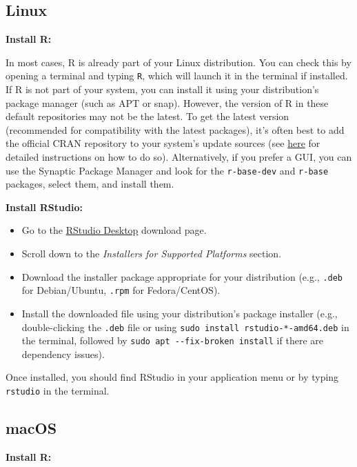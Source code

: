\documentclass[
]{book}
\providecommand{\tightlist}{%
  \setlength{\itemsep}{0pt}\setlength{\parskip}{0pt}}
\begin{document}
\subsection{Linux}\label{linux}

\textbf{Install R:}

In most cases, R is already part of your Linux distribution. You can check this by opening a terminal and typing \texttt{R}, which will launch it in the terminal if installed. If R is not part of your system, you can install it using your distribution's package manager (such as APT or snap). However, the version of R in these default repositories may not be the latest. To get the latest version (recommended for compatibility with the latest packages), it's often best to add the official CRAN repository to your system's update sources (see \href{https://cran.r-project.org/bin/linux/ubuntu/fullREADME.html}{here} for detailed instructions on how to do so). Alternatively, if you prefer a GUI, you can use the Synaptic Package Manager and look for the \texttt{r-base-dev} and \texttt{r-base} packages, select them, and install them.

\textbf{Install RStudio:}

\begin{itemize}
\tightlist
\item
  Go to the \href{https://posit.co/download/rstudio-desktop/}{RStudio Desktop} download page.
\item
  Scroll down to the \emph{Installers for Supported Platforms} section.
\item
  Download the installer package appropriate for your distribution (e.g., \texttt{.deb} for Debian/Ubuntu, \texttt{.rpm} for Fedora/CentOS).
\item
  Install the downloaded file using your distribution's package installer (e.g., double-clicking the \texttt{.deb} file or using \texttt{sudo\ install\ rstudio-*-amd64.deb} in the terminal, followed by \texttt{sudo\ apt\ -\/-fix-broken\ install} if there are dependency issues).
\end{itemize}

Once installed, you should find RStudio in your application menu or by typing \texttt{rstudio} in the terminal.

\subsection{macOS}\label{macos}

\textbf{Install R:}
\end{document}
